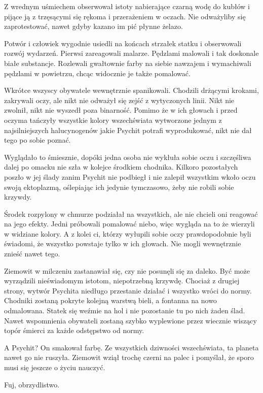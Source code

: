 Z wrednym uśmiechem obserwował istoty nabierające czarną wodę do kubłów i pijące ją z trzęsącymi się rękoma i przerażeniem w oczach.
Nie odważyliby się zaprotestować, nawet gdyby kazano im pić płynne żelazo.

\divider{}

Potwór i człowiek wygodnie usiedli na końcach strzałek statku i obserwowali rozwój wydarzeń.
Pierwsi zareagowali malarze. Pędzlami malowali i tak doskonale białe substancje. 
Rozlewali gwałtownie farby na siebie nawzajem i wymachiwali pędzlami w powietrzu, chcąc widocznie je także pomalować.

Wkrótce wszyscy obywatele wewnętrznie spanikowali. Chodzili drżącymi krokami, zakrywali oczy, ale nikt nie odważył się zejść z wytyczonych linii.
Nikt nie zwolnił, nikt nie wyszedł poza binarność.
Pomimo że w ich głowach i przed oczyma tańczyły wszystkie kolory wszechświata wytworzone jednym z najsilniejszych halucynogenów
jakie Psychit potrafi wyprodukować, nikt nie dał tego po sobie poznać.

Wyglądało to śmiesznie, dopóki jedna osoba nie wykłuła sobie oczu i szczęśliwa dalej po omacku nie szła w kolejce środkiem chodnika.
Kilkoro pozostałych poszło w jej ślady zanim Psychit nie podbiegł i nie zalepił wszystkim wkoło oczu swoją ektoplazmą, oślepiając ich jedynie tymczasowo, 
żeby nie robili sobie krzywdy.

Środek rozpylony w chmurze podziałał na wszystkich, ale nie chcieli oni reagować na jego efekty.
Jedni próbowali pomalować niebo, więc wygląda na to że wierzyli w widziane kolory.
A z kolei ci, którzy wyłupili sobie oczy prawdopodobnie byli świadomi, że wszystko powstaje tylko w ich głowach.
Nie mogli wewnętrznie znieść nawet tego.

Ziemowit w milczeniu zastanawiał się, czy nie posunęli się za daleko.
Być może wyrządzili nieświadomym istotom, niepotrzebną krzywdę.
Chociaż z drugiej strony, wytwór Psychita niedługo przestanie działać i wszystko wróci do normy.
Chodniki zostaną pokryte kolejną warstwą bieli, a fontanna na nowo odmalowana.
Statek się weźmie na hol i nie pozostanie tu po nich żaden ślad.
Nawet wspomnienia obywateli zostaną szybko wyplewione przez wiecznie wiszący topór śmierci za każde odstępstwo od normy.

A Psychit? On smakował farbę. 
Ze wszystkich dziwności wszechświata, ta planeta nawet go nie ruszyła.
Ziemowit wziął trochę czerni na palec i pomyślał, że sporo musi się jeszcze o życiu nauczyć.

Fuj, obrzydlistwo.







